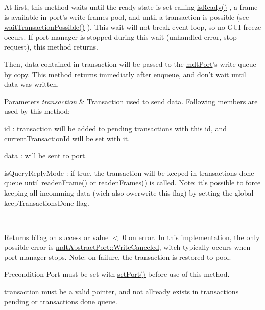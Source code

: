 At first, this method waits until the ready state is set calling \hyperlink{classmdt_usbtmc_port_manager_a0b90ceb0bbf424222ec878a355d206d7}{is\-Ready()} , a frame is available in port's write frames pool, and until a transaction is possible (see \hyperlink{classmdt_port_manager_ac04a12f8aa20ba04695083afce45a6cc}{wait\-Transaction\-Possible()} ). This wait will not break event loop, so no G\-U\-I freeze occurs. If port manager is stopped during this wait (unhandled error, stop request), this method returns.

Then, data contained in transaction will be passed to the \hyperlink{classmdt_port}{mdt\-Port}'s write queue by copy. This method returns immediatly after enqueue, and don't wait until data was written.


\begin{DoxyParams}{Parameters}
{\em transaction} & Transaction used to send data. Following members are used by this method\-:
\begin{DoxyItemize}
\item id \-: transaction will be added to pending transactions with this id, and current\-Transaction\-Id will be set with it.
\item data \-: will be sent to port.
\item is\-Query\-Reply\-Mode \-: if true, the transaction will be keeped in transactions done queue until \hyperlink{classmdt_port_manager_a830ae182d06dd6a52c43a7f45b9240ac}{readen\-Frame()} or \hyperlink{classmdt_port_manager_addd5dcae9644cea42a9871205af41796}{readen\-Frames()} is called. Note\-: it's possible to force keeping all incomming data (wich also owerwrite this flag) by setting the global keep\-Transactions\-Done flag.
\end{DoxyItemize}\\
\hline
\end{DoxyParams}
\begin{DoxyReturn}{Returns}
b\-Tag on success or value $<$ 0 on error. In this implementation, the only possible error is \hyperlink{classmdt_abstract_port_ad4121bb930c95887e77f8bafa065a85eae50ff4a9393507ad39005ddc7d5be42f}{mdt\-Abstract\-Port\-::\-Write\-Canceled}, witch typically occurs when port manager stops. Note\-: on failure, the transaction is restored to pool. 
\end{DoxyReturn}
\begin{DoxyPrecond}{Precondition}
Port must be set with \hyperlink{classmdt_port_manager_afcd156b2d0c9d340999935efb6cd8cb6}{set\-Port()} before use of this method. 

transaction must be a valid pointer, and not allready exists in transactions pending or transactions done queue. 
\end{DoxyPrecond}


